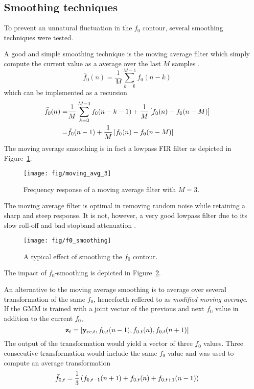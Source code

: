 \subsection{Smoothing techniques} %
\label{sub:smoothing_techniques}
To prevent an unnatural fluctuation in the $f_0$ contour, several smoothing techniques were tested. 

A good and simple smoothing technique is the moving average filter which simply compute the current value as a average over the last $M$ samples \cite{digsig}.
\begin{equation}
		\bar{f}_0(n) = \frac{1}{M}\sum_{k=0}^{M-1}f_0(n-k)
\end{equation}
which can be implemented as a recursion
\begin{equation}
	\begin{split}
		\bar{f}_0(n) = & \frac{1}{M} \sum_{k=0}^{M-1}f_0(n-k-1) + \frac{1}{M} \left[f_0(n)-f_0(n-M)\right] \\
		= & \bar{f}_0(n-1) + \frac{1}{M} \left[f_0(n)-f_0(n-M)\right] \\
	\end{split}
\end{equation}
The moving average smoothing is in fact a lowpass FIR filter as depicted in Figure~\ref{fig:moving_avg}.
\begin{figure}[htbp]
	\begin{center}
		\texttt{[image: fig/moving\_avg\_3]}
		\caption{Frequency response of a moving average filter with $M=3$.}
		\label{fig:moving_avg}
	\end{center}
\end{figure}
The moving average filter is optimal in removing random noise while retaining a sharp and steep response. It is not, however, a very good lowpass filter due to its slow roll-off and bad stopband attenuation \cite{digsig}.
\begin{figure}[htbp]
	\begin{center}
		\texttt{[image: fig/f0\_smoothing]}
		\caption{A typical effect of smoothing the $f_0$ contour.}
		\label{fig:f0_smoothing}
	\end{center}
\end{figure}
The impact of $f_0$-smoothing is depicted in Figure~\ref{fig:f0_smoothing}.

An alternative to the moving average smoothing is to average over several transformation of the same $f_0$, henceforth reffered to as \emph{modified moving average}. If the GMM is trained with a joint vector of the previous and next $f_0$ value in addition to the current $f_0$,
\begin{equation}
	\mathbf{z}_t = \left[\mathbf{y}_{cc,t}, f_{0,t}(n-1), f_{0,t}(n), f_{0,t}(n+1)\right] 
\end{equation}
The output of the transformation would yield a vector of three $f_0$ values. Three consecutive transformation would include the same $f_0$ value and was used to compute an average transformation
\begin{equation}
	\bar{f}_{0,t} = \frac{1}{3}\left(f_{0,t-1}(n+1)+f_{0,t}(n)+f_{0,t+1}(n-1)\right) 
\end{equation}

